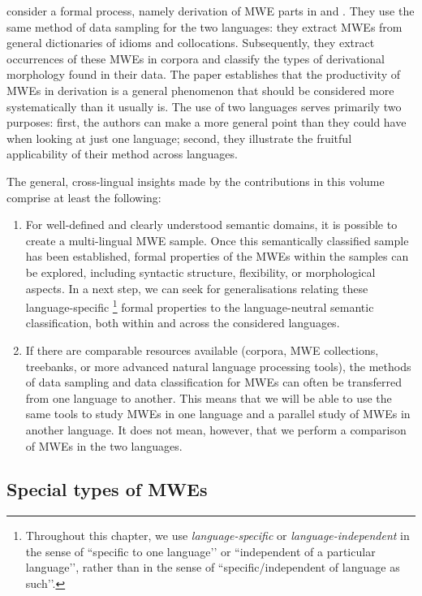 \documentclass[output=paper]{langsci/langscibook}
\begin{document}
\newpage 
consider a formal process, namely  derivation of MWE parts in  and . They use the same method of data sampling for the two languages: they extract MWEs from general dictionaries of idioms and collocations. Subsequently, they extract occurrences of these MWEs in corpora and classify the types of derivational morphology found in their data. The paper establishes that the productivity of MWEs in derivation is a general phenomenon that should be considered more systematically than it usually is. The use of two languages serves primarily two purposes: first, the authors can make a more general point than they could have when looking at just one language; second, they illustrate the fruitful applicability of their method across languages.

The general, cross-lingual insights made by the contributions in this volume comprise at least the following: 
\begin{enumerate}
\item For well-defined and clearly understood semantic domains, it is possible to create a multi-lingual MWE sample. Once this semantically classified sample has been established, formal properties of the MWEs within the samples can be explored, including syntactic structure, flexibility, or morphological aspects. In a next step, we can seek for generalisations relating these language-specific%
\footnote{Throughout this chapter, we use \emph{language-specific} or \emph{language-independent} in the sense of ``specific to one language’' or ``independent of a particular language'’, rather than in the sense of ``specific/independent of language as such’'.} 
formal properties to the language-neutral semantic classification, both within and across the considered languages.
\item If there are comparable resources available (corpora, MWE collections, treebanks, or more advanced natural language processing tools), the methods of data sampling and data classification for MWEs can often be transferred from one language to another. This means that we will be able to use the same tools to study MWEs in one language and a parallel study of MWEs in another language. It does not mean, however, that we perform a comparison of MWEs in the two languages. \\
\end{enumerate}

\subsection{Special types of MWEs}
\label{Sec-SpecialType}
\end{document}
